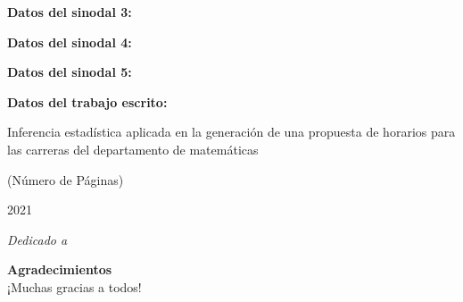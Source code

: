 \textbf{Datos del sinodal 3:}




\textbf{Datos del sinodal 4:}




\textbf{Datos del sinodal 5:}




\textbf{Datos del trabajo escrito:}

Inferencia estadística aplicada en la generación de una propuesta de horarios para las carreras del departamento de matemáticas

(Número de Páginas)

2021




\newpage %
\thispagestyle{empty} %

\begin{flushright}
\textit{Dedicado a \\}
\end{flushright}

\newpage %
\thispagestyle{empty} %

\textbf{\Huge{Agradecimientos}}\\
 
¡Muchas gracias a todos!

\newpage %
\thispagestyle{empty} %

\tableofcontents %
\listoffigures %
\listoftables %
\lstlistoflistings %


